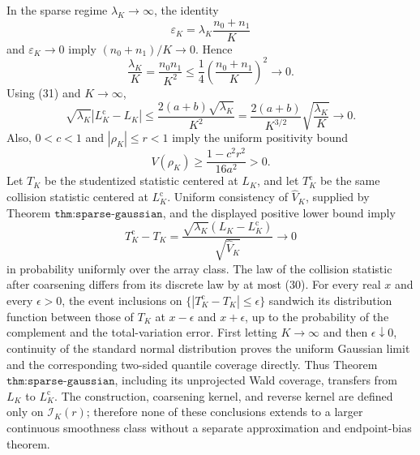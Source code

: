 In the sparse regime \(\lambda_K\to\infty\), the identity
\[
 \varepsilon_K
 =\lambda_K\frac{n_0+n_1}{K}
\]
and \(\varepsilon_K\to0\) imply
\((n_0+n_1)/K\to0\).  Hence
\[
 \frac{\lambda_K}{K}
 =\frac{n_0n_1}{K^2}
 \le\frac14\left(\frac{n_0+n_1}{K}\right)^2
 \longrightarrow0.
 \tag{33}
\]
Using (31) and \(K\to\infty\),
\[
 \sqrt{\lambda_K}|L_K^{\mathrm c}-L_K|
 \le\frac{2(a+b)\sqrt{\lambda_K}}{K^2}
 =\frac{2(a+b)}{K^{3/2}}
   \sqrt{\frac{\lambda_K}{K}}
 \longrightarrow0.
 \tag{34}
\]
Also, \(0<c<1\) and \(|\rho_K|\le r<1\) imply the uniform positivity
bound
\[
 V(\rho_K)\ge\frac{1-c^2r^2}{16a^2}>0.
\]
Let \(T_K\) be the studentized statistic centered at \(L_K\), and let
\(T_K^{\mathrm c}\) be the same collision statistic centered at
\(L_K^{\mathrm c}\).  Uniform consistency of \(\widehat V_K\), supplied
by Theorem \(\texttt{thm:sparse-gaussian}\), and the displayed positive
lower bound imply
\[
 T_K^{\mathrm c}-T_K
 =\frac{\sqrt{\lambda_K}(L_K-L_K^{\mathrm c})}
 {\sqrt{\widehat V_K}}
 \longrightarrow0
\]
in probability uniformly over the array class.  The law of the
collision statistic after coarsening differs from its discrete law by
at most (30).  For every real \(x\) and every \(\epsilon>0\), the event
inclusions on \(\{|T_K^{\mathrm c}-T_K|\le\epsilon\}\) sandwich its
distribution function between those of \(T_K\) at
\(x-\epsilon\) and \(x+\epsilon\), up to the probability of the
complement and the total-variation error.  First letting \(K\to\infty\)
and then \(\epsilon\downarrow0\), continuity of the standard normal
distribution proves the uniform Gaussian limit and the corresponding
two-sided quantile coverage directly.  Thus Theorem
\(\texttt{thm:sparse-gaussian}\), including its unprojected Wald
coverage, transfers from \(L_K\) to \(L_K^{\mathrm c}\).  The
construction, coarsening kernel, and reverse kernel are defined only on
\(\mathcal I_K(r)\); therefore none of these conclusions extends to a
larger continuous smoothness class without a separate approximation
and endpoint-bias theorem.

